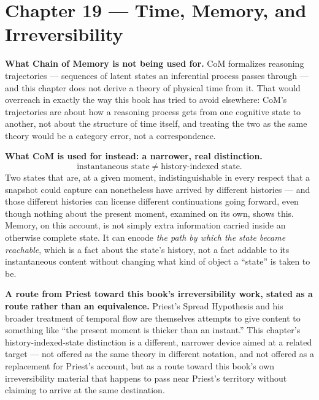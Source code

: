 \hypertarget{chapter-19-time-memory-and-irreversibility}{%
\chapter*{Chapter 19 --- Time, Memory, and Irreversibility}
\label{chapter-19-time-memory-and-irreversibility}}

\textbf{What Chain of Memory is not being used for.} CoM formalizes reasoning
trajectories --- sequences of latent states an inferential process passes
through --- and this chapter does not derive a theory of physical time from
it. That would overreach in exactly the way this book has tried to avoid
elsewhere: CoM's trajectories are about how a reasoning process gets from
one cognitive state to another, not about the structure of time itself,
and treating the two as the same theory would be a category error, not a
correspondence.

\textbf{What CoM is used for instead: a narrower, real distinction.}
\[\text{instantaneous state} \neq \text{history-indexed state}.\]
Two states that are, at a given moment, indistinguishable in every
respect that a snapshot could capture can nonetheless have arrived by
different histories --- and those different histories can license
different continuations going forward, even though nothing about the
present moment, examined on its own, shows this. Memory, on this
account, is not simply extra information carried inside an otherwise
complete state. It can encode \emph{the path by which the state became
reachable}, which is a fact about the state's history, not a fact
addable to its instantaneous content without changing what kind of
object a ``state'' is taken to be.

\textbf{A route from Priest toward this book's irreversibility work, stated as
a route rather than an equivalence.} Priest's Spread Hypothesis and his
broader treatment of temporal flow are themselves attempts to give
content to something like ``the present moment is thicker than an
instant.'' This chapter's history-indexed-state distinction is a
different, narrower device aimed at a related target --- not offered as
the same theory in different notation, and not offered as a replacement
for Priest's account, but as a route toward this book's own
irreversibility material that happens to pass near Priest's territory
without claiming to arrive at the same destination.

